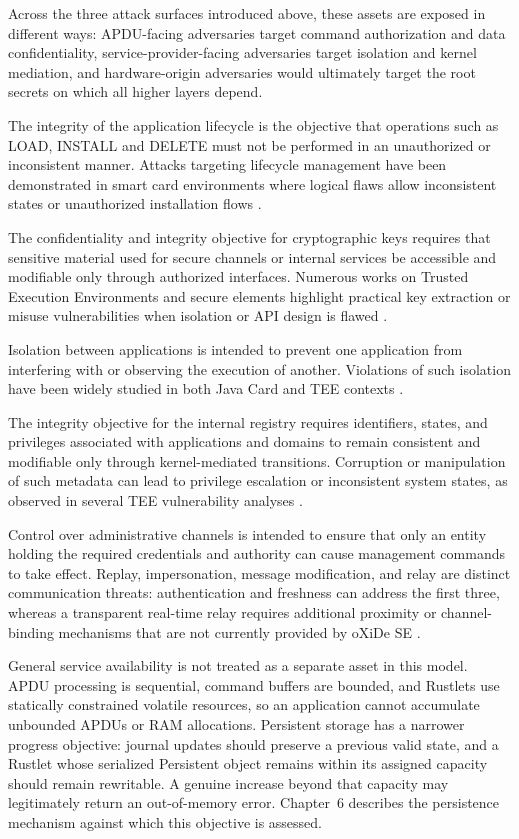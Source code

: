 Across the three attack surfaces introduced above, these assets are exposed in
different ways: APDU-facing adversaries target command authorization and data
confidentiality, service-provider-facing adversaries target isolation and
kernel mediation, and hardware-origin adversaries would ultimately target the
root secrets on which all higher layers depend.

The integrity of the application lifecycle is the objective that operations
such as LOAD, INSTALL and DELETE must not be performed in an unauthorized or
inconsistent manner. Attacks targeting lifecycle management
have been demonstrated in smart card environments where logical flaws allow
inconsistent states or unauthorized installation flows
\cite{mostowski2008malicious, barbu2010javacard}.

The confidentiality and integrity objective for cryptographic keys requires
that sensitive material used for secure channels or internal services be
accessible and modifiable only through authorized interfaces. Numerous works
on Trusted Execution Environments and secure elements
highlight practical key extraction or misuse vulnerabilities when isolation or
API design is flawed \cite{shakevsky2022keymaster, busch2020trustedcore}.

Isolation between applications is intended to prevent one application from
interfering with or observing the execution of another. Violations of such
isolation have been widely studied in both Java Card and TEE contexts
\cite{mostowski2008malicious, cerdeira2022rezone}.

The integrity objective for the internal registry requires identifiers, states,
and privileges associated with applications and domains to remain consistent
and modifiable only through kernel-mediated transitions. Corruption or
manipulation of such metadata can lead to privilege
escalation or inconsistent system states, as observed in several TEE
vulnerability analyses \cite{munoz2023tee}.

Control over administrative channels is intended to ensure that only an entity
holding the required credentials and authority can cause management commands to
take effect. Replay, impersonation, message modification, and relay are distinct
communication threats: authentication and freshness can address the first
three, whereas a transparent real-time relay requires additional proximity or
channel-binding mechanisms that are not currently provided by oXiDe SE
\cite{roland2012relay, francis2011relay}.

General service availability is not treated as a separate asset in this model.
APDU processing is sequential, command buffers are bounded, and Rustlets use
statically constrained volatile resources, so an application cannot accumulate
unbounded APDUs or RAM allocations. Persistent storage has a narrower progress
objective: journal updates should preserve a previous valid state, and a
Rustlet whose serialized Persistent object remains within its assigned capacity should
remain rewritable. A genuine increase beyond that capacity may legitimately
return an out-of-memory error. Chapter~6 describes the persistence mechanism
against which this objective is assessed.

